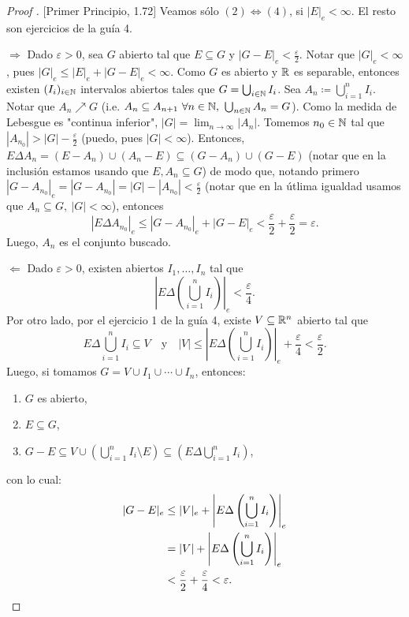 
\begin{proof}[Proof ][Primer Principio, 1.72]
	Veamos sólo $(2) \iff (4)$, si $|E|_e < \infty$. El resto son ejercicios de la guía 4. \par
	$\boxed{\Rightarrow}$ Dado $\varepsilon > 0$, sea $G$ abierto tal que $E \subseteq G$ y $|G - E|_e < \frac{\varepsilon}{2}$. Notar que $|G|_e < \infty$, pues $|G|_e \leq |E|_e + |G - E|_e < \infty$. Como $G$ es abierto y $\mathbb{R}$ es separable, entonces existen $(I_i)_{i\in\mathbb{N}}$ intervalos abiertos tales que $G = \bigcup_{i\in\mathbb{N}} I_i$. Sea $A_n \coloneq \bigcup_{i=1}^{n} I_i$. Notar que $A_n \nearrow G$ (i.e. $A_n \subseteq A_{n+1} \ \forall n \in \mathbb{N},\ \bigcup_{n\in\mathbb{N}} A_n = G$). Como la medida de Lebesgue es "continua inferior", $|G| = \lim_{n \to \infty} |A_n|$. Tomemos $n_{0} \in \mathbb{N}$ tal que $|A_{n_{0}}| > |G| - \frac{\varepsilon}{2}$ (puedo, pues $|G| < \infty$). Entonces, $E \Delta A_n = (E - A_n) \cup (A_n - E) \subseteq (G - A_n) \cup (G - E)$ (notar que en la inclusión estamos usando que $E,A_n \subseteq G$) de modo que, notando primero $|G - A_{n_{0}}|_e = |G - A_{n_{0}}| = |G| - |A_{n_{0}}| < \frac{\varepsilon}{2}$ (notar que en la útlima igualdad usamos que $A_n \subseteq G,\ |G| < \infty$), entonces
	\[ |E \Delta A_{n_{0}}|_e \leq |G - A_{n_{0}}|_e + |G - E|_e < \frac{\varepsilon}{2} + \frac{\varepsilon}{2} = \varepsilon. \]
	Luego, $A_n$ es el conjunto buscado. \par
	$\boxed{\Leftarrow}$ Dado $\varepsilon > 0$, existen abiertos $I_{1},\dots,I_{n}$ tal que
	\[ \left| E \Delta \left( \bigcup_{i=1}^{n} I_{i} \right) \right|_e < \frac{\varepsilon}{4}. \]
	Por otro lado, por el ejercicio 1 de la guía 4, existe $V \subseteq \mathbb{R}^n$ abierto tal que
	\[ E \Delta \bigcup_{i=1}^{n} I_{i} \subseteq V \quad \text{y} \quad |V| \leq \left| E \Delta \left( \bigcup_{i=1}^{n} I_{i} \right) \right|_e + \frac{\varepsilon}{4} < \frac{\varepsilon}{2}. \]
	Luego, si tomamos $G = V \cup I_{1} \cup \cdots \cup I_{n}$, entonces:
	\begin{enumerate}
		\item $G$ es abierto,

		\item $E \subseteq G$,

		\item $G - E \subseteq V \cup (\bigcup_{i=1}^{n} I_{i} \setminus E) \subseteq (E \Delta \bigcup_{i=1}^{n} I_{i})$,
	\end{enumerate}
	con lo cual:
	\begin{align*}
		|G - E|_e &\leq |V|_e + \left| E \Delta \left( \bigcup_{i=1}^{n} I_{i} \right) \right|_e \\
		&= |V| + \left| E \Delta \left( \bigcup_{i=1}^{n} I_{i} \right) \right|_e \\
		&< \frac{\varepsilon}{2} + \frac{\varepsilon}{4} < \varepsilon
	.\qedhere\end{align*}
\end{proof}

